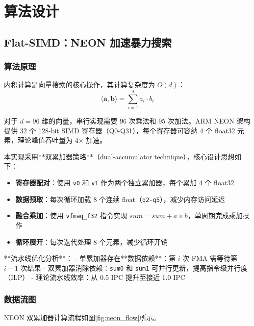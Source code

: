 \documentclass[a4paper]{article}
\begin{document}
\section{算法设计}

\subsection{Flat-SIMD：NEON 加速暴力搜索}

\subsubsection{算法原理}

内积计算是向量搜索的核心操作，其计算复杂度为 $O(d)$：
$$\langle \mathbf{a}, \mathbf{b} \rangle = \sum_{i=1}^{d} a_i \cdot b_i$$

对于 $d=96$ 维的向量，串行实现需要 96 次乘法和 95 次加法。ARM NEON 架构提供 32 个 128-bit SIMD 寄存器（Q0-Q31），每个寄存器可容纳 4 个 float32 元素，理论峰值吞吐量为 4$\times$ 加速。

本实现采用**双累加器策略**（dual-accumulator technique），核心设计思想如下：

\begin{itemize}
  \item \textbf{寄存器配对}：使用 \texttt{v0} 和 \texttt{v1} 作为两个独立累加器，每个累加 4 个 float32
  \item \textbf{数据预取}：每次循环加载 8 个连续 float（\texttt{q2-q5}），减少内存访问延迟
  \item \textbf{融合乘加}：使用 \texttt{vfmaq\_f32} 指令实现 $sum = sum + a \times b$，单周期完成乘加操作
  \item \textbf{循环展开}：每次迭代处理 8 个元素，减少循环开销
\end{itemize}

**流水线优化分析**：
- 单累加器存在**数据依赖**：第 $i$ 次 FMA 需等待第 $i-1$ 次结果
- 双累加器消除依赖：\texttt{sum0} 和 \texttt{sum1} 可并行更新，提高指令级并行度（ILP）
- 理论流水线效率：从 0.5 IPC 提升至接近 1.0 IPC

\subsubsection{数据流图}

NEON 双累加器计算流程如图\ref{fig:neon_flow}所示。
\end{document}
